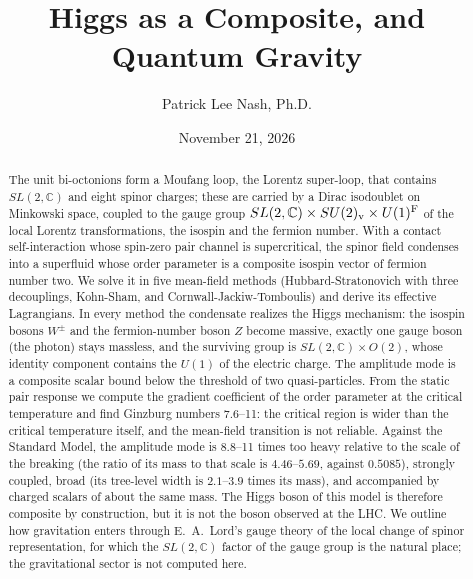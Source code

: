\documentclass[aps,prd,twocolumn,superscriptaddress,nofootinbib,floatfix,longbibliography]{revtex4-2}
\begin{document}
\title{Higgs as a Composite, and Quantum Gravity}

\author{Patrick Lee Nash, Ph.D.}

\date{November 21, 2026}

\begin{abstract}
The unit bi-octonions form a Moufang loop, the Lorentz super-loop, that contains $SL(2,\mathbb C)$ and eight spinor
charges; these are carried by a Dirac isodoublet on Minkowski space, coupled to the gauge group
$SL(2,\mathbb C)\times SU(2)_{\rm v}\times U(1)^{\rm F}$ of the local Lorentz transformations, the isospin and the fermion
number. With a contact self-interaction whose spin-zero pair channel is supercritical, the spinor field condenses into a
superfluid whose order parameter is a composite isospin vector of fermion number two. We solve it in five mean-field
methods (Hubbard-Stratonovich with three decouplings, Kohn-Sham, and Cornwall-Jackiw-Tomboulis) and derive its effective
Lagrangians. In every method the condensate realizes the Higgs mechanism: the isospin bosons $W^\pm$ and the
fermion-number boson $Z$ become massive, exactly one gauge boson (the photon) stays massless, and the surviving group is
$SL(2,\mathbb C)\times O(2)$, whose identity component contains the $U(1)$ of the electric charge. The amplitude mode is a
composite scalar bound below the threshold of two quasi-particles. From the static pair response we compute the gradient
coefficient of the order parameter at the critical temperature and find Ginzburg numbers 7.6\mbox{--}11: the critical region
is wider than the critical temperature itself, and the mean-field transition is not reliable. Against the Standard Model, the amplitude mode is
8.8\mbox{--}11 times too heavy relative to the scale of the breaking (the ratio of its mass to that scale is $4.46\mbox{--}5.69$,
against $0.5085$), strongly coupled, broad (its tree-level width is $2.1\mbox{--}3.9$ times its mass), and accompanied by
charged scalars of about the same mass.
The Higgs boson of this model is therefore composite by construction, but it is not the boson observed at the LHC. We
outline how gravitation enters through E.~A.~Lord's gauge theory of the local change of spinor representation, for which
the $SL(2,\mathbb C)$ factor of the gauge group is the natural place; the gravitational sector is not computed here.
\end{abstract}

\maketitle
\end{document}
